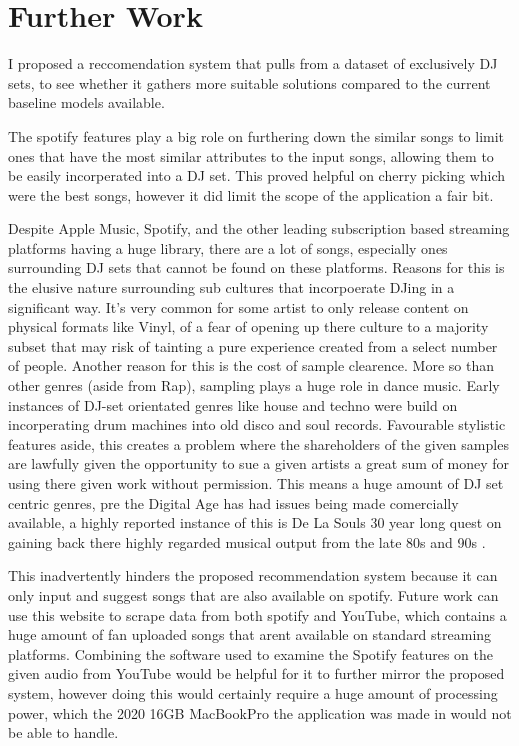 
\graphicspath{{Chapter7/}}

\chapter{Further Work}

I proposed a reccomendation system that pulls from a dataset of exclusively DJ sets, to see whether it gathers more suitable solutions compared to the current baseline models available. 

The spotify features play a big role on furthering down the similar songs to limit ones that have the most similar attributes to the input songs, allowing them to be easily incorperated into a DJ set. This proved helpful on cherry picking which were the best songs, however it did limit the scope of the application a fair bit. 

Despite Apple Music, Spotify, and the other leading subscription based streaming platforms having a huge library, there are a lot of songs, especially ones surrounding DJ sets that cannot be found on these platforms. Reasons for this is the elusive nature surrounding sub cultures that incorpoerate DJing in a significant way. It's very common for some artist to only release content on physical formats like Vinyl, of a fear of opening up there culture to a majority subset that may risk of tainting a pure experience created from a select number of people. Another reason for this is the cost of sample clearence. More so than other genres (aside from Rap), sampling plays a huge role in dance music. Early instances of DJ-set orientated genres like house and techno were build on incorperating drum machines into old disco and soul records. Favourable stylistic features aside, this creates a problem where the shareholders of the given samples are lawfully given the opportunity to sue a given artists a great sum of money for using there given work without permission. This means a huge amount of DJ set centric genres, pre the Digital Age has had issues being made comercially available, a highly reported instance of this is De La Souls 30 year long quest on gaining back there highly regarded musical output from the late 80s and 90s \citep{saunders_soul_2023}.

This inadvertently hinders the proposed recommendation system because it can only input and suggest songs that are also available on spotify. Future work can use this website to scrape data from both spotify and YouTube, which contains a huge amount of fan uploaded songs that arent available on standard streaming platforms. Combining the software used to examine the Spotify features on the given audio from YouTube would be helpful for it to further mirror the proposed system, however doing this would certainly require a huge amount of processing power, which the 2020 16GB MacBookPro the application was made in would not be able to handle.

